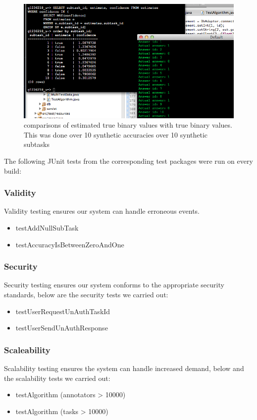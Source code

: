 \documentclass[11pt]{article}
\begin{document}
\begin{figure}[H]
\begin{center}
\includegraphics[width=\linewidth]{images/test2.png}
\caption{comparisons of estimated true binary values with true binary values. This was done over 10 synthetic accuracies over 10 synthetic subtasks}
\label{default}
\end{center}
\end{figure}

The following JUnit tests from the corresponding test packages were run on every build:

\subsubsection{Validity}
Validity testing ensures our system can handle erroneous events.
\begin{itemize}
\item testAddNullSubTask
\item testAccuracyIsBetweenZeroAndOne
\end{itemize}
\subsubsection{Security}
Security testing ensures our system conforms to the appropriate security standards, below are the security tests we carried out:
\begin{itemize}
\item testUserRequestUnAuthTaskId
\item testUserSendUnAuthResponse
\end{itemize}
\subsubsection{Scaleability}
Scalability testing ensures the system can handle increased demand, below and the scalability tests we carried out:
\begin{itemize}
\item testAlgorithm (annotators > 10000)
\item testAlgorithm (tasks > 10000)
\end{itemize}
\end{document}
